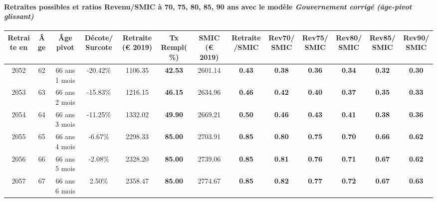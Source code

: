 \paragraph{Retraites possibles et ratios Revenu/SMIC à 70, 75, 80, 85, 90 ans avec le modèle \emph{Gouvernement corrigé (âge-pivot glissant)}}  
 
{ \scriptsize \begin{center} 
\begin{tabular}[htb]{|c|c||c|c||c|c||c||c|c|c|c|c|c|} 
\hline 
 Retraite en &  Âge &  Âge pivot &  Décote/Surcote &  Retraite (\euro{} 2019) &  Tx Rempl(\%) &  SMIC (\euro{} 2019) &  Retraite/SMIC &  Rev70/SMIC &  Rev75/SMIC &  Rev80/SMIC &  Rev85/SMIC &  Rev90/SMIC \\ 
\hline \hline 
 2052 &  62 &  66 ans 1 mois &  -20.42\% &  1106.35 &  {\bf 42.53} &  2601.14 &  {\bf {\color{red} 0.43}} &  {\bf {\color{red} 0.38}} &  {\bf {\color{red} 0.36}} &  {\bf {\color{red} 0.34}} &  {\bf {\color{red} 0.32}} &  {\bf {\color{red} 0.30}} \\ 
\hline 
 2053 &  63 &  66 ans 2 mois &  -15.83\% &  1216.15 &  {\bf 46.15} &  2634.96 &  {\bf {\color{red} 0.46}} &  {\bf {\color{red} 0.42}} &  {\bf {\color{red} 0.40}} &  {\bf {\color{red} 0.37}} &  {\bf {\color{red} 0.35}} &  {\bf {\color{red} 0.33}} \\ 
\hline 
 2054 &  64 &  66 ans 3 mois &  -11.25\% &  1332.02 &  {\bf 49.90} &  2669.21 &  {\bf {\color{red} 0.50}} &  {\bf {\color{red} 0.46}} &  {\bf {\color{red} 0.43}} &  {\bf {\color{red} 0.41}} &  {\bf {\color{red} 0.38}} &  {\bf {\color{red} 0.36}} \\ 
\hline 
 2055 &  65 &  66 ans 4 mois &  -6.67\% &  2298.33 &  {\bf 85.00} &  2703.91 &  {\bf {\color{red} 0.85}} &  {\bf {\color{red} 0.80}} &  {\bf {\color{red} 0.75}} &  {\bf {\color{red} 0.70}} &  {\bf {\color{red} 0.66}} &  {\bf {\color{red} 0.62}} \\ 
\hline 
 2056 &  66 &  66 ans 5 mois &  -2.08\% &  2328.20 &  {\bf 85.00} &  2739.06 &  {\bf {\color{red} 0.85}} &  {\bf {\color{red} 0.81}} &  {\bf {\color{red} 0.76}} &  {\bf {\color{red} 0.71}} &  {\bf {\color{red} 0.67}} &  {\bf {\color{red} 0.62}} \\ 
\hline 
 2057 &  67 &  66 ans 6 mois &  2.50\% &  2358.47 &  {\bf 85.00} &  2774.67 &  {\bf {\color{red} 0.85}} &  {\bf {\color{red} 0.82}} &  {\bf {\color{red} 0.77}} &  {\bf {\color{red} 0.72}} &  {\bf {\color{red} 0.67}} &  {\bf {\color{red} 0.63}} \\ 
\hline 
\hline 
\end{tabular} 
\end{center} } 
